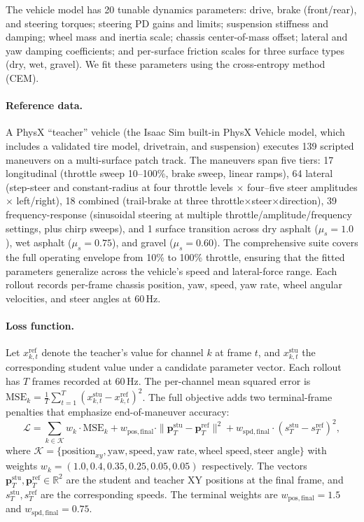 The vehicle model has 20 tunable dynamics parameters: drive, brake (front/rear), and steering torques; steering PD gains and limits; suspension stiffness and damping; wheel mass and inertia scale; chassis center-of-mass offset; lateral and yaw damping coefficients; and per-surface friction scales for three surface types (dry, wet, gravel).
We fit these parameters using the cross-entropy method (CEM).

\paragraph{Reference data.}
A PhysX ``teacher'' vehicle (the Isaac Sim built-in PhysX Vehicle model, which includes a validated tire model, drivetrain, and suspension) executes 139 scripted maneuvers on a multi-surface patch track.
The maneuvers span five tiers: 17 longitudinal (throttle sweep 10--100\%, brake sweep, linear ramps), 64 lateral (step-steer and constant-radius at four throttle levels $\times$ four--five steer amplitudes $\times$ left/right), 18 combined (trail-brake at three throttle$\times$steer$\times$direction), 39 frequency-response (sinusoidal steering at multiple throttle/amplitude/frequency settings, plus chirp sweeps), and 1 surface transition across dry asphalt ($\mu_s{=}1.0$), wet asphalt ($\mu_s{=}0.75$), and gravel ($\mu_s{=}0.60$).
The comprehensive suite covers the full operating envelope from 10\% to 100\% throttle, ensuring that the fitted parameters generalize across the vehicle's speed and lateral-force range.
Each rollout records per-frame chassis position, yaw, speed, yaw rate, wheel angular velocities, and steer angles at 60\,Hz.

\paragraph{Loss function.}
Let $x^{\mathrm{ref}}_{k,t}$ denote the teacher's value for channel $k$ at frame $t$, and $x^{\mathrm{stu}}_{k,t}$ the corresponding student value under a candidate parameter vector.
Each rollout has $T$ frames recorded at 60\,Hz.
The per-channel mean squared error is $\mathrm{MSE}_k = \tfrac{1}{T}\sum_{t=1}^{T}(x^{\mathrm{stu}}_{k,t} - x^{\mathrm{ref}}_{k,t})^2$.
The full objective adds two terminal-frame penalties that emphasize end-of-maneuver accuracy:
\begin{equation}
\label{eq:app_sysid_loss}
\mathcal{L} = \sum_{k \in \mathcal{K}} w_k \cdot \mathrm{MSE}_k
  + w_{\mathrm{pos,final}} \cdot \|\mathbf{p}^{\mathrm{stu}}_T - \mathbf{p}^{\mathrm{ref}}_T\|^2
  + w_{\mathrm{spd,final}} \cdot (s^{\mathrm{stu}}_T - s^{\mathrm{ref}}_T)^2,
\end{equation}
where $\mathcal{K} = \{\text{position}_{xy}, \text{yaw}, \text{speed}, \text{yaw rate}, \text{wheel speed}, \text{steer angle}\}$ with weights $w_k = (1.0, 0.4, 0.35, 0.25, 0.05, 0.05)$ respectively.
The vectors $\mathbf{p}^{\mathrm{stu}}_T, \mathbf{p}^{\mathrm{ref}}_T \in \mathbb{R}^2$ are the student and teacher XY positions at the final frame, and $s^{\mathrm{stu}}_T, s^{\mathrm{ref}}_T$ are the corresponding speeds.
The terminal weights are $w_{\mathrm{pos,final}} = 1.5$ and $w_{\mathrm{spd,final}} = 0.75$.

